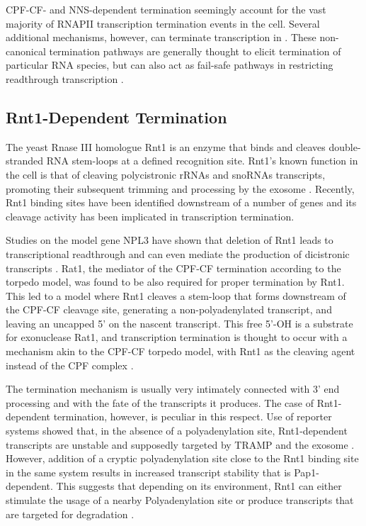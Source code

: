CPF-CF- and NNS-dependent termination seemingly account for the vast majority of RNAPII transcription termination events in the cell.
Several additional mechanisms, however, can terminate transcription in \cer{}. 
These non-canonical termination pathways are generally thought to elicit termination of particular RNA species, but can also act as fail-safe pathways in restricting readthrough transcription \cite{ghazal:2005:genomewide}.


\subsection{Rnt1-Dependent Termination}

The yeast Rnase III homologue Rnt1 is an enzyme that binds and cleaves double-stranded RNA stem-loops at a defined recognition site. 
Rnt1’s known function in the cell is that of cleaving polycistronic rRNAs and snoRNAs transcripts, promoting their subsequent trimming and processing by the exosome \cite{ghazal:2005:genomewide}. 
Recently, Rnt1 binding sites have been identified downstream of a number of genes and its cleavage activity has been implicated in transcription termination.

Studies on the model gene NPL3 have shown that deletion of Rnt1 leads to transcriptional readthrough and can even mediate the production of dicistronic transcripts \cite{ghazal:2009:yeast}. 
Rat1, the mediator of the CPF-CF termination according to the torpedo model, was found to be also required for proper termination by Rnt1. 
This led to a model where Rnt1 cleaves a stem-loop that forms downstream of the CPF-CF cleavage site, generating a non-polyadenylated transcript, and leaving an uncapped 5’ on the nascent transcript. 
This free 5’-OH is a substrate for exonuclease Rat1, and transcription termination is thought to occur with a mechanism akin to the CPF-CF torpedo model, with Rnt1 as the cleaving agent instead of the CPF complex  \cite{ghazal:2009:yeast, rondo:2009:failsafe}.

The termination mechanism is usually very intimately connected with 3’ end processing and with the fate of the transcripts it produces. The case of Rnt1-dependent termination, however, is peculiar in this respect.
Use of \invivo{} reporter systems showed that, in the absence of a polyadenylation site, Rnt1-dependent transcripts are unstable and supposedly targeted by TRAMP and the exosome \cite{ghazal:2009:yeast}. 
However, addition of a cryptic polyadenylation site close to the Rnt1 binding site in the same system results in increased transcript stability that is Pap1-dependent. 
This suggests that depending on its environment, Rnt1 can either stimulate the usage of a nearby Polyadenylation site or produce transcripts that are targeted for degradation \cite{rondo:2009:failsafe}.

